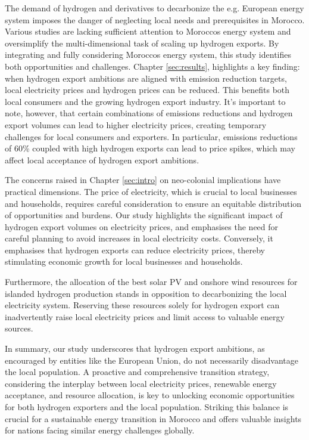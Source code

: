 The demand of hydrogen and derivatives to decarbonize the e.g. European energy system imposes the danger of neglecting local needs and prerequisites in Morocco. Various studies \cite{vanWijk2021, AbouSeada2022, vanderZwaan2021, Schellekens2010, Touili2022, Timmerberg2019a, Sens2022} are lacking sufficient attention to Moroccos energy system and oversimplify the multi-dimensional task of scaling up hydrogen exports. By integrating and fully considering Moroccos energy system, this study identifies both opportunities and challenges. Chapter \ref{sec:results}, highlights a key finding: when hydrogen export ambitions are aligned with emission reduction targets, local electricity prices and hydrogen prices can be reduced. This benefits both local consumers and the growing hydrogen export industry. It's important to note, however, that certain combinations of emissions reductions and hydrogen export volumes can lead to higher electricity prices, creating temporary challenges for local consumers and exporters. 
In particular, emissions reductions of 60\% coupled with high hydrogen exports can lead to price spikes, which may affect local acceptance of hydrogen export ambitions.

The concerns raised in Chapter \ref{sec:intro} on neo-colonial implications have practical dimensions. The price of electricity, which is crucial to local businesses and households, requires careful consideration to ensure an equitable distribution of opportunities and burdens. Our study highlights the significant impact of hydrogen export volumes on electricity prices, and emphasises the need for careful planning to avoid increases in local electricity costs. Conversely, it emphasises that hydrogen exports can reduce electricity prices, thereby stimulating economic growth for local businesses and households.

Furthermore, the allocation of the best solar PV and onshore wind resources for islanded hydrogen production stands in opposition to decarbonizing the local electricity system. Reserving these resources solely for hydrogen export can inadvertently raise local electricity prices and limit access to valuable energy sources.

In summary, our study underscores that hydrogen export ambitions, as encouraged by entities like the European Union, do not necessarily disadvantage the local population. A proactive and comprehensive transition strategy, considering the interplay between local electricity prices, renewable energy acceptance, and resource allocation, is key to unlocking economic opportunities for both hydrogen exporters and the local population. Striking this balance is crucial for a sustainable energy transition in Morocco and offers valuable insights for nations facing similar energy challenges globally.

